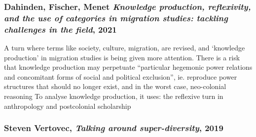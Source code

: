 \documentclass{article}
\begin{document}
\subsubsection{Dahinden, Fischer, Menet \textit{Knowledge production, reflexivity, and the use of categories in migration studies: tackling challenges in the field}, 2021}

\begin{outline}
	\1 A turn where terms like society, culture, migration, are revised, and `knowledge production' in migration studies is being given more attention. There is a risk that knowledge production may perpetuate ``particular hegemonic power relations and concomitant forms of social and political exclusion'', ie. reproduce power structures that should no longer exist, and in the worst case, neo-colonial reasoning
	\1 To analyse knowledge production, it uses: the reflexive turn in anthropology and postcolonial scholarship
\end{outline}

\subsubsection{Steven Vertovec, \textit{Talking around super-diversity}, 2019}
\end{document}

